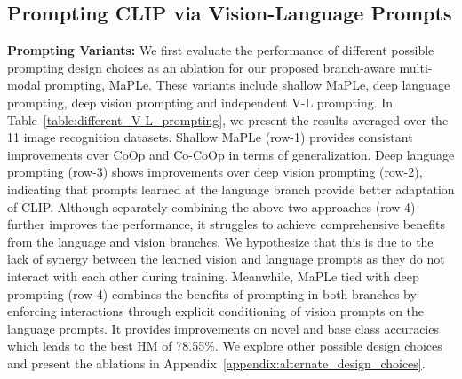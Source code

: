 \documentclass[10pt,twocolumn,letterpaper]{article}
\begin{document}
\begin{table}[t!]
    \centering
    \caption{ Comparison of MaPLe with different prompting designs in base-to-novel generalization. Results are averaged over 11 datasets. HM refers to harmonic mean. 
    }
    \label{table:different_V-L_prompting}
\end{table}



\subsection{Prompting CLIP via Vision-Language Prompts}
\noindent \textbf{Prompting Variants:} We first evaluate the performance of different possible prompting design choices as an ablation for our proposed branch-aware multi-modal prompting, MaPLe. These variants include shallow MaPLe, deep language prompting, deep vision prompting and independent V-L prompting. In Table~\ref{table:different_V-L_prompting}, we present the results averaged over the 11 image recognition datasets. Shallow MaPLe (row-1) provides consistant improvements over CoOp and Co-CoOp in terms of generalization. Deep language prompting (row-3) shows improvements over deep vision prompting (row-2), indicating that prompts learned at the language branch provide better adaptation of CLIP. Although separately combining the above two approaches (row-4) further improves the performance, it struggles to achieve comprehensive benefits from the language and vision branches. We hypothesize that this is due to the lack of synergy between the learned vision and language prompts as they do not interact with each other during training. Meanwhile, MaPLe tied with deep prompting (row-4) combines the benefits of prompting in both branches by enforcing interactions through explicit conditioning of vision prompts on the language prompts. It provides improvements on novel and base class accuracies which leads to the best HM of 78.55\%. We explore other possible design choices and present the ablations in Appendix~\ref{appendix:alternate_design_choices}.
\end{document}
